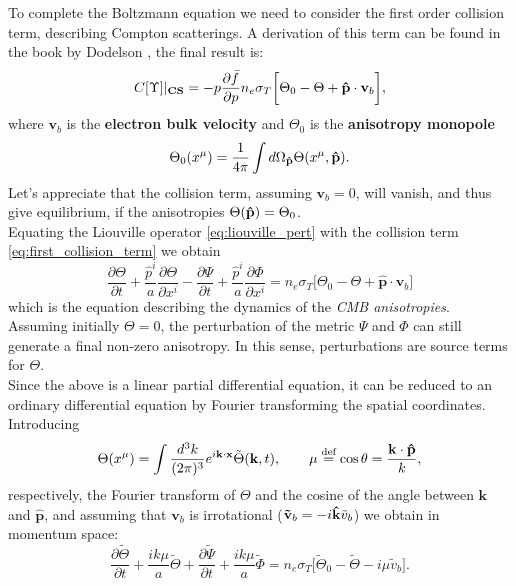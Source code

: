 To complete the Boltzmann equation we need to consider the first order collision term, describing Compton scatterings. A derivation of this term can be found in the book by Dodelson \cite{dodelson}, the final result is:
\begin{equation} \label{eq:first_collision_term}
    C[\Upsilon]|_{\text{\textbf{CS}}} = -p\frac{\partial\bar f}{\partial p} n_{e}\sigma_T\bigg[\Theta_0-\Theta+\mathbf{\hat{p}}\cdot\mathbf{v}_{b}\bigg],
\end{equation}
where $\mathbf{v}_{b}$ is the \textbf{electron bulk velocity} and $\Theta_0$ is the \textbf{anisotropy monopole}
$$\Theta_0(x^\mu)=\frac{1}{4\pi}\int d\Omega_{\mathbf{\hat{p}}} \Theta(x^\mu,\mathbf{\hat{p}}).$$
Let's appreciate that the collision term, assuming $\mathbf{v}_b=0$, will vanish, and thus give equilibrium, if the anisotropies $\Theta(\mathbf{\hat{p}})=\Theta_0$.\\
Equating the Liouville operator \eqref{eq:liouville_pert} with the collision term \eqref{eq:first_collision_term} we obtain
\begin{equation}\label{eq:phot_boltzmann_pert}
    \frac{\partial \Theta}{\partial t}+\frac{\hat p^i}{a}\frac{\partial \Theta}{\partial x^i}-\frac{\partial\Psi}{\partial t}+\frac{\hat p^i}{a}\frac{\partial \Phi}{\partial x^i}=n_{e}\sigma_T\bigg[\Theta_0-\Theta+\mathbf{\hat{p}}\cdot\mathbf{v}_{b}\bigg]
\end{equation}
which is the equation describing the dynamics of the \emph{CMB anisotropies}. Assuming initially $\Theta=0$, the perturbation of the metric $\Psi$ and $\Phi$ can still generate a final non-zero anisotropy. In this sense, perturbations are source terms for $\Theta$.\\
Since the above is a linear partial differential equation, it can be reduced to an ordinary differential equation by Fourier transforming the spatial coordinates.
Introducing 
$$\Theta(x^\mu) = \int \frac{d^3k}{(2\pi)^3}e^{i\mathbf{k}\cdot\mathbf{x}}\tilde\Theta(\mathbf{k},t),\qquad \mu\stackrel{\text{def}}{=} \cos\theta=\frac{\mathbf{k}\cdot\mathbf{\hat{p}}}{k},$$respectively, the Fourier transform of $\Theta$ and the cosine of the angle between $\mathbf{k}$ and $\mathbf{\hat{p}}$, and assuming that $\mathbf{v}_b$ is irrotational ($\mathbf{\tilde v}_b=-i\mathbf{\hat{k}}\tilde v_b$) we obtain in momentum space:
\begin{equation*}
    \frac{\partial \tilde\Theta}{\partial t} +\frac{ik\mu}{a}\tilde\Theta+\frac{\partial \tilde\Psi}{\partial t}+\frac{ik\mu}{a}\tilde\Phi=n_e \sigma_T\Bigg[\tilde\Theta_0-\tilde\Theta-i\mu\tilde v_b\Bigg].
\end{equation*}
